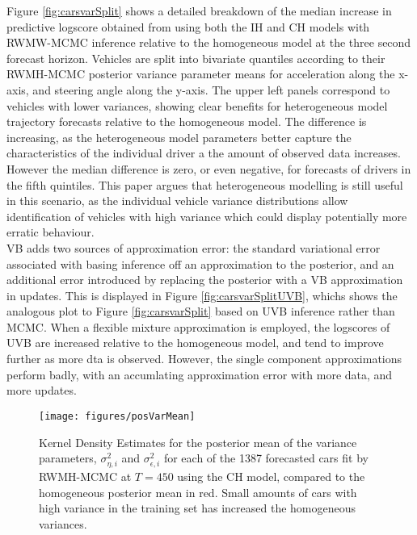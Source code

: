 \documentclass[
12pt, %
onehalfspacing, %
nohyperref, %
headsepline, %
chapterinoneline, %
]{MastersDoctoralThesis} %
\begin{document}
Figure \ref{fig:carsvarSplit} shows a detailed breakdown of the median increase in predictive logscore obtained from using both the IH and CH models with RWMW-MCMC inference relative to the homogeneous model at the three second forecast horizon. Vehicles are split into bivariate quantiles according to their RWMH-MCMC posterior variance parameter means for acceleration along the x-axis, and steering angle along the y-axis. The upper left panels correspond to vehicles with lower variances, showing clear benefits for heterogeneous model trajectory forecasts relative to the homogeneous model. The difference is increasing, as the heterogeneous model parameters better capture the characteristics of the individual driver a the amount of observed data increases. However the median difference is zero, or even negative, for forecasts of drivers in the fifth quintiles. This paper argues that heterogeneous modelling is still useful in this scenario, as the individual vehicle variance distributions allow identification of vehicles with high variance which could display potentially more erratic behaviour.
\\

VB adds two sources of approximation error: the standard variational error associated with basing inference off an approximation to the posterior, and an additional error introduced by replacing the posterior with a VB approximation in updates. This is displayed in Figure \ref{fig:carsvarSplitUVB}, whichs shows the analogous plot to Figure \ref{fig:carsvarSplit} based on UVB inference rather than MCMC. When a flexible mixture approximation is employed, the logscores of UVB are increased relative to the homogeneous model, and tend to improve further as more dta is observed. However, the single component approximations perform badly, with an accumlating approximation error with more data, and more updates. 

\begin{figure}[htbp]
\centering
\texttt{[image: figures/posVarMean]}
\caption{Kernel Density Estimates for the posterior mean of the variance parameters, $\sigma^2_{\eta, i}$ and $\sigma^2_{\epsilon, i}$ for each of the 1387 forecasted cars fit by RWMH-MCMC at $T = 450$ using the CH model, compared to the homogeneous posterior mean in red. Small amounts of cars with high variance in the training set has increased the homogeneous variances.}
\label{fig:carsposVarMean}
\end{figure}
\end{document}
